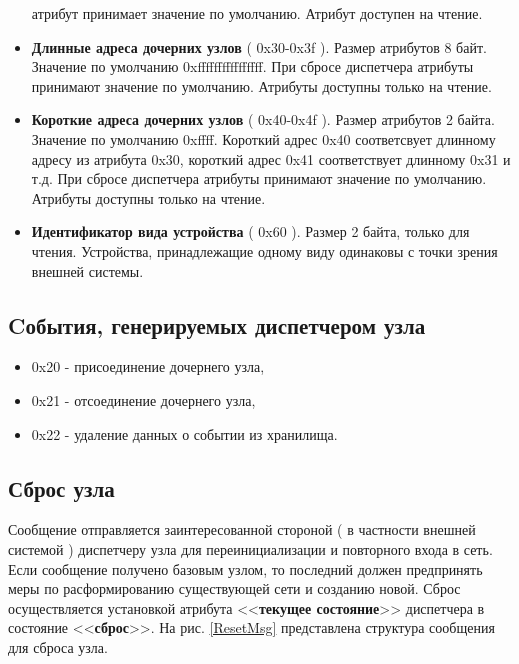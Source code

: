 \begin{itemize}
атрибут принимает значение по умолчанию. Атрибут доступен на чтение.
\item {\bfseries Длинные адреса дочерних узлов} ( 0x30-0x3f ). Размер атрибутов 8 байт. Значение по умолчанию 0xffffffffffffffff.
При сбросе диспетчера атрибуты принимают значение по умолчанию. Атрибуты доступны только на чтение.
\item {\bfseries Короткие адреса дочерних узлов} ( 0x40-0x4f ). Размер атрибутов 2 байта. Значение по умолчанию 0xffff.
Короткий адрес 0x40 соответсвует длинному адресу из атрибута 0x30, короткий адрес 0x41 соответствует длинному 0x31
и т.д. При сбросе диспетчера атрибуты принимают значение по умолчанию. Атрибуты доступны только на чтение.
\item {\bfseries Идентификатор вида устройства} ( 0x60 ). Размер 2 байта, только для чтения. Устройства, принадлежащие одному виду одинаковы с точки зрения внешней системы.
\end{itemize}

\subsection{Cобытия, генерируемых диспетчером узла}
\begin{itemize}
\item 0x20 - присоединение дочернего узла,
\item 0x21 - отсоединение дочернего узла,
\item 0x22 - удаление данных о событии из хранилища.
\end{itemize}

\subsection{Сброс узла}
\label{ResetNode}

Сообщение отправляется заинтересованной стороной ( в частности внешней системой ) диспетчеру 
узла для переинициализации и повторного входа в сеть. Если сообщение получено базовым узлом,
то последний должен предпринять меры по расформированию существующей сети и созданию новой.
Сброс осуществляется установкой атрибута <<{\bfseries текущее состояние}>> диспетчера в состояние <<{\bfseries сброс}>>.
На рис. \ref{ResetMsg} представлена структура сообщения для сброса узла.

